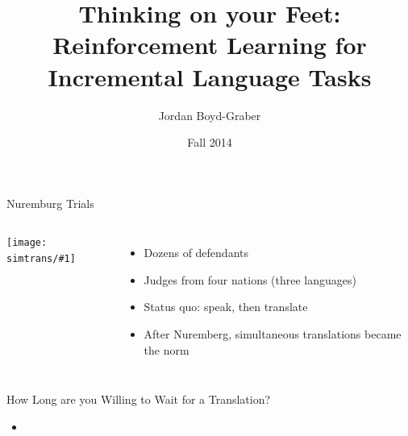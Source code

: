\documentclass[compress]{beamer}
\title[Thinking on Your Feet]{Thinking on your Feet: Reinforcement Learning for Incremental
Language Tasks}
\author{ Jordan Boyd-Graber}
\date{Fall 2014}
\institute[Boulder] %
{University of Colorado Boulder}
\newcommand{\gfxs}[2]{
\begin{center}
	\texttt{[image: simtrans/\#1]}
\end{center}
}
\begin{document}
\frame{
\titlepage
\tiny
}


\begin{frame}{Nuremburg Trials}

\begin{columns}


    \gfxs{nuremberg_trials}{1.0}


    \begin{itemize}
        \item Dozens of defendants
        \item Judges from four nations (three languages)
\pause
        \item Status quo: speak, then translate
\pause
        \item After Nuremberg, simultaneous translations became the norm
     \end{itemize}

\end{columns}

\end{frame}


\begin{frame}{How Long are you Willing to Wait for a Translation?}

\begin{itemize}
  \item {}



\end{itemize}

\end{frame}
\end{document}
